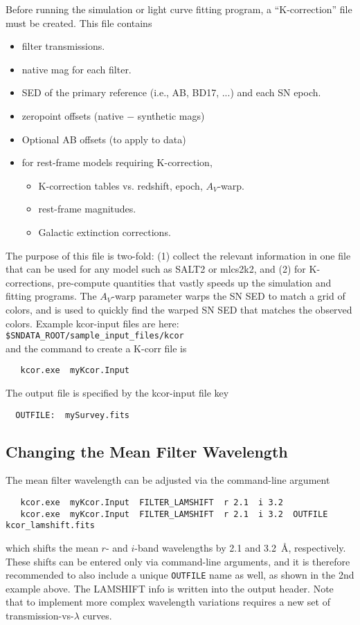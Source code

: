 \documentclass[12pt]{article}
\newcommand{\lam}{\lambda}
\begin{document}
{Before running the simulation or light curve fitting program,
a ``K-correction'' file must be created.
This file contains 
\begin{itemize}[noitemsep]
  \item filter transmissions.
  \item native mag for each filter.
  \item SED of the primary reference (i.e., AB, BD17, ...)
           and each SN epoch.
  \item zeropoint offsets (native $-$ synthetic mags)
  \item Optional AB offsets (to apply to data)
  \item for rest-frame models requiring K-correction,
  \begin{itemize}[noitemsep]
    \item K-correction tables vs. 
             redshift, epoch, $A_V$-warp.
    \item rest-frame magnitudes.
    \item Galactic extinction corrections.
  \end{itemize}
\end{itemize}
The purpose of this file is two-fold:
(1) collect the relevant information in one file
that can be used for any model such as  SALT2 or mlcs2k2, and
(2) for K-corrections, pre-compute quantities that vastly
speeds up the simulation and fitting programs.
The $A_V$-warp parameter warps the SN SED to match a grid
of colors, and is used to quickly find the warped SN SED
that matches the observed colors.
Example kcor-input files are here:
   {\tt \$SNDATA\_ROOT/sample\_input\_files/kcor} \\
%
and the command to create a K-corr file is
\begin{verbatim}
   kcor.exe  myKcor.Input
\end{verbatim}
%
The output file is specified by the kcor-input file key
%
\begin{verbatim}
  OUTFILE:  mySurvey.fits
\end{verbatim}


\subsection{Changing the Mean Filter Wavelength}

The mean filter wavelength can be adjusted via the command-line
argument
\begin{verbatim}
   kcor.exe  myKcor.Input  FILTER_LAMSHIFT  r 2.1  i 3.2
   kcor.exe  myKcor.Input  FILTER_LAMSHIFT  r 2.1  i 3.2  OUTFILE kcor_lamshift.fits
\end{verbatim}
which shifts the mean $r$- and $i$-band  wavelengths
by 2.1 and 3.2~\AA, respectively. These shifts can be entered
only via command-line arguments, and it is therefore recommended
to also include a unique {\tt OUTFILE} name as well, as shown
in the 2nd example above. The LAMSHIFT info is written into
the output header. Note that to implement more complex wavelength
variations requires a new set of 
transmission-vs-$\lam$ curves.


}
\end{document}
